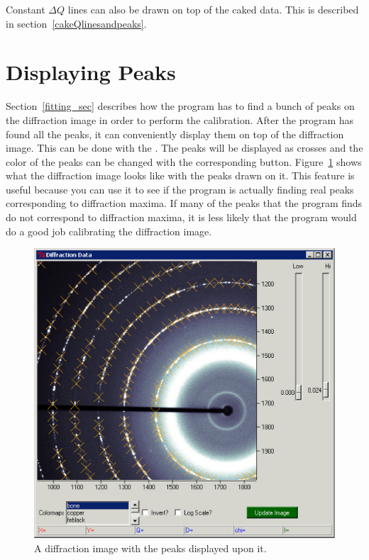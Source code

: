 Constant $\Delta Q$ 
lines can also be drawn on top of the caked data. This 
is described in section~\ref{cakeQlinesandpeaks}.

\section{Displaying Peaks}\label{displaying_peaks_diffraction}

Section~\ref{fitting_sec} describes how the program has to find a bunch
of peaks on the diffraction image in order to perform the calibration.
After the program has found all the peaks, it can conveniently display
them on top of the diffraction image. This can be done with the
. The peaks will be displayed as crosses and the color
of the peaks can be changed with the corresponding  button.
Figure~\ref{peaks_on_diffraction_image} shows what the diffraction image
looks like with the peaks drawn on it. This feature is useful because 
you can use it to see if the program is actually finding real peaks
corresponding to diffraction maxima. If many of the peaks that the program 
finds do not correspond to diffraction maxima, it is less likely that 
the program would do a good job calibrating the diffraction image.

\begin{figure}
    \centering
    \includegraphics[scale=.75]{figures/peaks_on_diffraction_image.eps}
    \caption{A diffraction image with the peaks displayed upon it.}
    \label{peaks_on_diffraction_image}
\end{figure}

